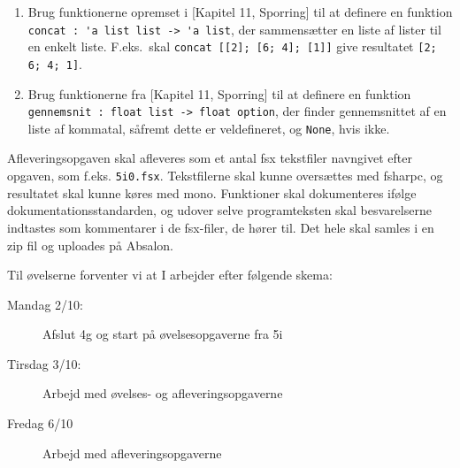 \documentclass[a4paper,12pt]{article}
\begin{document}
\begin{enumerate}[label=5i.\arabic*,start=0]
\begin{enumerate}
\end{enumerate}
\item Brug funktionerne opremset i [Kapitel 11, Sporring] til at definere en funktion \lstinline{concat : 'a list list -> 'a list}, der sammensætter en liste af lister til en enkelt liste.  F.eks.\ skal \lstinline{concat [[2]; [6; 4]; [1]]} give resultatet \lstinline{[2; 6; 4; 1]}.
\item Brug funktionerne fra [Kapitel 11, Sporring]  til at definere en funktion \lstinline{gennemsnit : float list -> float option}, der finder gennemsnittet af en liste af kommatal, såfremt dette er veldefineret, og \lstinline{None}, hvis ikke.
\end{enumerate}

Afleveringsopgaven skal afleveres som et antal fsx tekstfiler navngivet efter opgaven, som f.eks. \lstinline!5i0.fsx!. Tekstfilerne skal kunne oversættes med fsharpc, og resultatet skal kunne køres med mono. Funktioner skal dokumenteres ifølge dokumentationsstandarden, og udover selve programteksten skal besvarelserne indtastes som kommentarer i de fsx-filer, de hører til. Det hele skal samles i en zip fil og uploades på Absalon.

Til øvelserne forventer vi at I arbejder efter følgende skema:
\begin{description}
\item[Mandag 2/10:] Afslut 4g og start på øvelsesopgaverne fra 5i
\item[Tirsdag 3/10:] Arbejd med øvelses- og afleveringsopgaverne
\item[Fredag 6/10]  Arbejd med afleveringsopgaverne
\end{description}
\end{document}
